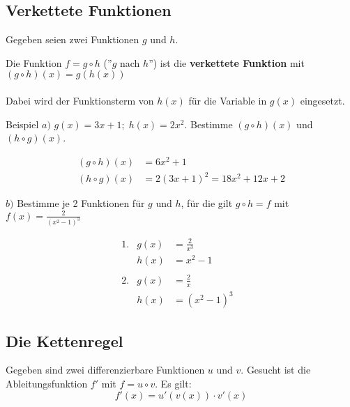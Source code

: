 \documentclass{article}
\begin{document}
\subsection{Verkettete Funktionen}

Gegeben seien zwei Funktionen $g$ und $h$.

Die Funktion $\displaystyle f = g \circ h$ (''$g$ nach $h$'') 
ist die \textbf{verkettete Funktion} mit
$(g \circ h)(x) = g\left(h(x)\right)$
\\\\
Dabei wird der Funktionsterm von $h(x)$ für die Variable in $g(x)$ eingesetzt.

\begin{boxx}[DarkBlue]{Beispiel}
    $a)$\hspace{3mm} $g(x) = 3x + 1;\; h(x)= 2x^2$. 
    Bestimme $(g \circ h)(x)$ und $(h \circ g)(x)$.

    \begin{align*}
        (g \circ h)(x) &= 6x^2+1 \\
        (h \circ g)(x) &= 2(3x+1)^2 = 18x^2 + 12x + 2
    \end{align*}
    
    $b)$\hspace{3mm} Bestimme je 2 Funktionen für $g$ und $h$, für die gilt
    $g \circ h = f$ mit $\displaystyle f(x) = \frac{2}{\left(x^2-1\right)^3}$

    \begin{align*}
        &&&\text{1.} & g(x) &= \frac{2}{x^3} &&&&\\
        &&&& h(x) &= x^2-1 &&&&\\\\
        &&&\text{2.} & g(x) &= \frac{2}{x} &&&&\\
        &&&& h(x) &= \left(x^2 - 1\right)^3 &&&&
    \end{align*}
\end{boxx}

\newpage

\subsection{Die Kettenregel}

Gegeben sind zwei differenzierbare Funktionen $u$ und $v$.
Gesucht ist die Ableitungsfunktion $f'$ mit $f = u \circ v$. Es gilt:
\[f'(x) = u'\left(v(x)\right) \cdot v'(x)\]
\end{document}
